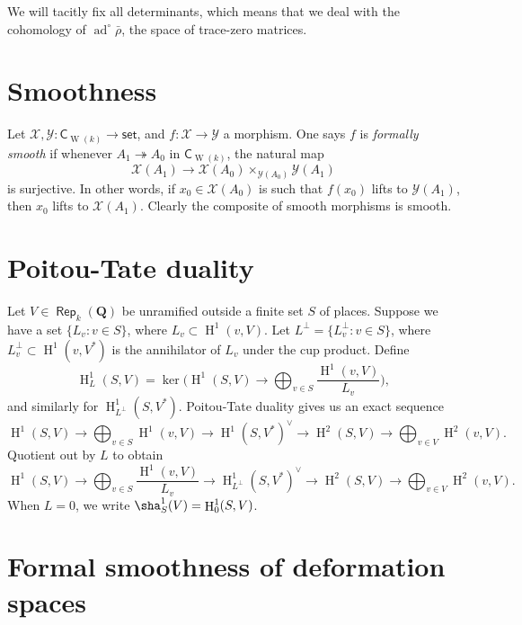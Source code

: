 \documentclass{article}
\DeclareMathOperator{\adjoint}{ad}
\DeclareMathOperator{\h}{H}
\DeclareMathOperator{\rep}{\mathsf{Rep}}
\DeclareMathOperator{\witt}{W}
\newcommand{\cX}{\mathcal{X}}
\newcommand{\cY}{\mathcal{Y}}
\newcommand{\dQ}{\mathbf{Q}}
\newcommand{\coef}{\mathsf{C}}
\newcommand{\set}{\mathsf{set}}
\begin{document}
We will tacitly fix all determinants, which means that we deal with the cohomology of 
$\adjoint^\circ\bar\rho$, the space of trace-zero matrices. 





\section{Smoothness}

Let $\cX,\cY\colon \coef_{\witt(k)}\to \set$, and $f\colon \cX\to \cY$ a morphism. One says 
$f$ is \emph{formally smooth} if whenever $A_1\twoheadrightarrow A_0$ in 
$\coef_{\witt(k)}$, the natural map 
\[
  \cX(A_1) \to \cX(A_0)\times_{\cY(A_0)} \cY(A_1)
\]
is surjective. In other words, if $x_0\in \cX(A_0)$ is such that $f(x_0)$ lifts to 
$\cY(A_1)$, then $x_0$ lifts to $\cX(A_1)$. Clearly the composite of smooth morphisms is 
smooth. 





\section{Poitou-Tate duality}

Let $V\in \rep_k(\dQ)$ be unramified outside a finite set $S$ of places. Suppose we 
have a set $\{L_v:v\in S\}$, where $L_v\subset \h^1(v,V)$. Let $L^\bot=\{L_v^\bot:v\in S\}$, 
where $L_v^\bot\subset \h^1(v,V^\ast)$ is the annihilator of $L_v$ under the cup product. 
Define 
\[
  \h_L^1(S,V) = \ker\bigg(\h^1(S,V)\to \bigoplus_{v\in S} \frac{\h^1(v,V)}{L_v}\bigg) ,
\]
and similarly for $\h_{L^\bot}^1(S,V^\ast)$. Poitou-Tate duality gives us an exact 
sequence 
\[
  \h^1(S,V)\to \bigoplus_{v\in S} \h^1(v,V)\to \h^1(S,V^\ast)^\vee\to \h^2(S,V)\to \bigoplus_{v\in V} \h^2(v,V) .
\]
Quotient out by $L$ to obtain 
\begin{equation}\label{eq:pt}\tag{$\ast$}
  \h^1(S,V)\to \bigoplus_{v\in S} \frac{\h^1(v,V)}{L_v}\to \h_{L^\bot}^1(S,V^\ast)^\vee\to \h^2(S,V)\to \bigoplus_{v\in V} \h^2(v,V) .
\end{equation}
When $L=0$, we write $\sha^1_S(V)=\h^1_0(S,V)$. 





\section{Formal smoothness of deformation spaces}
\end{document}
